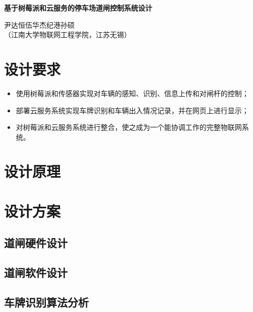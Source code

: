 \documentclass[a4paper]{ctexart}
\begin{document}

\begin{spacing}{1}
	\tableofcontents
\end{spacing}
\newpage
\setcounter{page}{1}
\begin{center}
	{\textbf{基于树莓派和云服务的停车场道闸控制系统设计}}

	{尹达恒\quad 伍华杰\quad 纪港\quad 孙硕}\\[-1mm]

	{（江南大学物联网工程学院，江苏\quad 无锡）}
\end{center}
\renewcommand{\baselinestretch}{1.3}
\songti{}
\section{设计要求}
\begin{itemize}
	\item 使用树莓派和传感器实现对车辆的感知、识别、信息上传和对闸杆的控制；
	\item 部署云服务系统实现车牌识别和车辆出入情况记录，并在网页上进行显示；
	\item 对树莓派和云服务系统进行整合，使之成为一个能协调工作的完整物联网系统。
\end{itemize}

\section{设计原理}


\section{设计方案}
\subsection{道闸硬件设计}


\subsection{道闸软件设计}


\subsection{车牌识别算法分析}\label{车牌识别算法分析}

\end{document}
